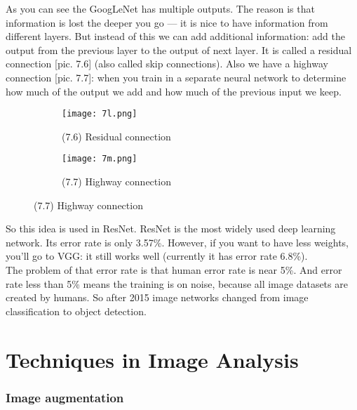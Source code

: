 As you can see the GoogLeNet has multiple outputs. The reason is that information is lost the deeper you go --- it is nice to have information from different layers. But instead of this we can add additional information: add the output from the previous layer to the output of next layer. It is called a residual connection [pic. 7.6] (also called skip connections). Also we have a highway connection [pic. 7.7]: when you train in a separate neural network to determine how much of the output we add and how much of the previous input we keep.\\
\begin{figure}[h]
  \centering
  \begin{subfigure}[l]{0.31\linewidth}
    \texttt{[image: 7l.png]}
    \caption*{(7.6) Residual connection}
  \end{subfigure}
  \hspace{2cm}
  \begin{subfigure}[r]{0.4\linewidth}
    \texttt{[image: 7m.png]}
    \caption*{(7.7) Highway connection}
  \end{subfigure}
\end{figure}
So this idea is used in ResNet. ResNet is the most widely used deep learning network. Its error rate is only 3.57\%. However, if you want to have less weights, you'll go to VGG: it still works well (currently it has error rate 6.8\%).\\
The problem of that error rate is that human error rate is near 5\%. And error rate less than 5\% means the training is on noise, because all image datasets are created by humans. So after 2015 image networks changed from image classification to object detection.

\section{Techniques in Image Analysis}
\vspace{-0.6cm}
\subsubsection*{Image augmentation}

